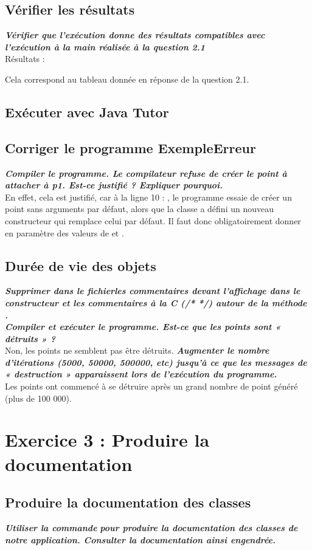 \documentclass{sebaClass}
\newcommand{\q}[1]{\textit{\textbf{#1}}\\}
\newcommand{\ql}[1]{\textit{\textbf{#1}}}
\begin{document}
\subsection{Vérifier les résultats}
\q{Vérifier que l’exécution donne des résultats compatibles avec l’exécution à la main réalisée à la question 2.1}
Résultats :

Cela correspond au tableau donnée en réponse de la question 2.1.
\subsection{Exécuter avec Java Tutor}
\subsection{Corriger le programme ExempleErreur}
\ql{Compiler le programme}\q{. Le compilateur refuse de créer le point à attacher à p1. Est-ce justifié ? Expliquer pourquoi.}
En effet, cela est justifié, car à la ligne 10 : , le programme  essaie de créer
un point sans arguments par défaut, alors que la classe  a défini un nouveau constructeur qui remplace celui par défaut. Il faut donc
obligatoirement donner en paramètre des valeurs de  et .
\subsection{Durée de vie des objets}
\ql{Supprimer dans le fichier}\ql{les commentaires devant l’affichage dans le constructeur et les commentaires
   à la C (/* */) autour de la méthode} \q{.}
\ql{Compiler et exécuter le programme}\q{. Est-ce que les points sont « détruits » ?}
Non, les points ne semblent pas être détruits.
\q{Augmenter le nombre d’itérations (5000, 50000, 500000, etc) jusqu’à ce que les messages de « destruction » apparaissent lors de l’exécution du
   programme.}
Les points ont commencé à se détruire après un grand nombre de point généré (plus de 100 000).
\section{Exercice 3 : Produire la documentation}
\subsection{Produire la documentation des classes}
\ql{Utiliser la commande}  \q{pour produire la documentation des classes de notre application. Consulter la documentation ainsi
   engendrée.}
\end{document}
